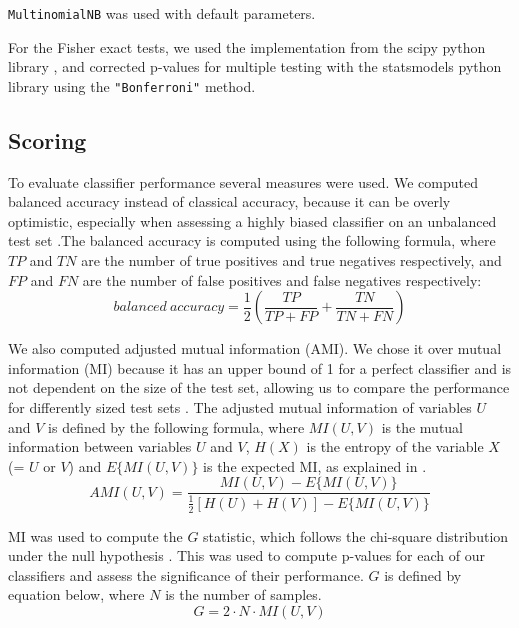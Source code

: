 \documentclass[
  11pt,
  twoside,
  BCOR=10mm,
  listof=totoc]{scrbook}
\begin{document}
\texttt{MultinomialNB} was used with default parameters.

For the Fisher exact tests, we used the implementation from the scipy python library \autocite{virtanenSciPyFundamentalAlgorithms2020}, and corrected p-values for multiple testing with the statsmodels python library \autocite{seaboldStatsmodelsEconometricStatistical2010} using the \texttt{"Bonferroni"} method.

\hypertarget{scoring}{%
\subsection{Scoring}\label{scoring}}

To evaluate classifier performance several measures were used. We computed balanced accuracy instead of classical accuracy, because it can be overly optimistic, especially when assessing a highly biased classifier on an unbalanced test set \autocite{brodersenBalancedAccuracyIts2010}.The balanced accuracy is computed using the following formula, where \(TP\) and \(TN\) are the number of true positives and true negatives respectively, and \(FP\) and \(FN\) are the number of false positives and false negatives respectively:\\
\[
balanced~accuracy = \frac{1}{2}\left(
      \frac{TP}{TP + FP} + \frac{TN}{TN + FN}
  \right)
\]

We also computed adjusted mutual information (AMI). We chose it over mutual information (MI) because it has an upper bound of 1 for a perfect classifier and is not dependent on the size of the test set, allowing us to compare the performance for differently sized test sets \autocite{vinhInformationTheoreticMeasures2010}. The adjusted mutual information of variables \(U\) and \(V\) is defined by the following formula, where \(MI(U,V)\) is the mutual information between variables \(U\) and \(V\), \(H(X)\) is the entropy of the variable \(X\) (= \(U\) or \(V\)) and \(E\{MI(U,V)\}\) is the expected MI, as explained in \autocite{vinhNovelApproachAutomatic2009}.\\
\[
AMI(U,V) = \frac{
      MI(U,V) - E\{MI(U,V)\} 
  }{
      \frac{1}{2}[H(U) + H(V)] - E\{MI(U,V)\}
  }
\]

MI was used to compute the \(G\) statistic, which follows the chi-square distribution under the null hypothesis \autocite{harremoesMutualInformationContingency2014}. This was used to compute p-values for each of our classifiers and assess the significance of their performance. \(G\) is defined by equation below, where \(N\) is the number of samples.\\
\[G = 2\cdot N \cdot MI(U,V)\]
\end{document}
